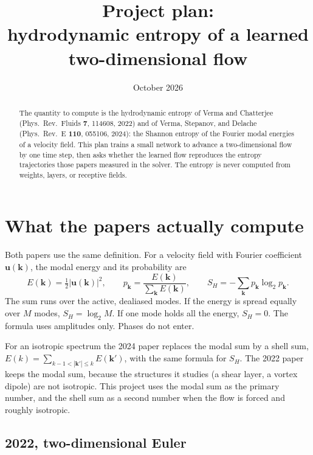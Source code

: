 \documentclass[11pt,a4paper]{article}
\title{Project plan:\\hydrodynamic entropy of a learned\\two-dimensional flow}
\author{}
\date{October 2026}
\begin{document}
\maketitle

\begin{abstract}
The quantity to compute is the hydrodynamic entropy of Verma and Chatterjee
(Phys.\ Rev.\ Fluids \textbf{7}, 114608, 2022) and of Verma, Stepanov, and Delache
(Phys.\ Rev.\ E \textbf{110}, 055106, 2024): the Shannon entropy of the Fourier
modal energies of a velocity field.
This plan trains a small network to advance a two-dimensional flow by one time
step, then asks whether the learned flow reproduces the entropy trajectories
those papers measured in the solver.
The entropy is never computed from weights, layers, or receptive fields.
\end{abstract}

\section{What the papers actually compute}

Both papers use the same definition.
For a velocity field with Fourier coefficient \(\mathbf{u}(\mathbf{k})\), the modal energy and its probability are
\begin{equation}
  E(\mathbf{k}) = \tfrac12 |\mathbf{u}(\mathbf{k})|^2,
  \qquad
  p_{\mathbf{k}} = \frac{E(\mathbf{k})}{\sum_{\mathbf{k}} E(\mathbf{k})},
  \qquad
  S_H = -\sum_{\mathbf{k}} p_{\mathbf{k}}\log_2 p_{\mathbf{k}}.
  \label{eq:SH}
\end{equation}
The sum runs over the active, dealiased modes.
If the energy is spread equally over \(M\) modes, \(S_H = \log_2 M\).
If one mode holds all the energy, \(S_H = 0\).
The formula uses amplitudes only. Phases do not enter.

For an isotropic spectrum the 2024 paper replaces the modal sum by a shell sum,
\(E(k) = \sum_{k-1 < |\mathbf{k}'| \le k} E(\mathbf{k}')\), with the same formula for \(S_H\).
The 2022 paper keeps the modal sum, because the structures it studies (a shear layer, a vortex dipole) are not isotropic.
This project uses the modal sum as the primary number, and the shell sum as a second number when the flow is forced and roughly isotropic.

\subsection{2022, two-dimensional Euler}
\end{document}
